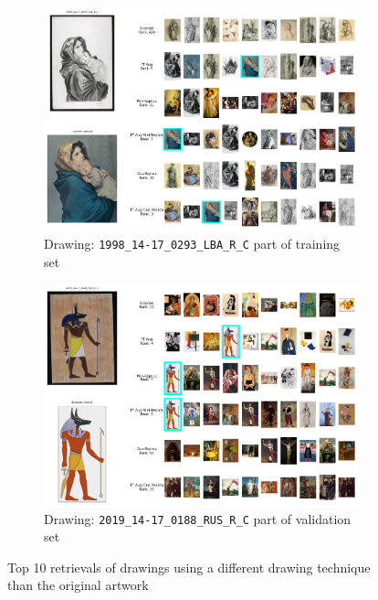 {\begin{landscape}
\begin{figure}
\begin{subfigure}[b]{0.55\textwidth}
         \label{fig:2000_14-17_1583_COL_R_C}
     \end{subfigure}
     \hfil
     \begin{subfigure}[b]{0.55\textwidth}
         \centering
         \includegraphics[width=1.01\textwidth]{images/qualitative_analysis/1998_14-17_0293_LBA_R_C.png}
         \caption{Drawing: \texttt{1998\_14-17\_0293\_LBA\_R\_C} part of training set}
         \label{fig:1998_14-17_0293_LBA_R_C}
     \end{subfigure}
     \hfil
     \begin{subfigure}[b]{0.55\textwidth}
         \centering
         \includegraphics[width=1.01\textwidth]{images/qualitative_analysis/2019_14-17_0188_RUS_R_C.png}
         \caption{Drawing: \texttt{2019\_14-17\_0188\_RUS\_R\_C} part of validation set}
         \label{fig:2019_14-17_0188_RUS_R_C}
     \end{subfigure}
        \caption{Top 10 retrievals of drawings using a different drawing technique than the original artwork}
        \label{fig:technique-limitation}
\end{figure}

    \end{landscape}
    \clearpage
}



